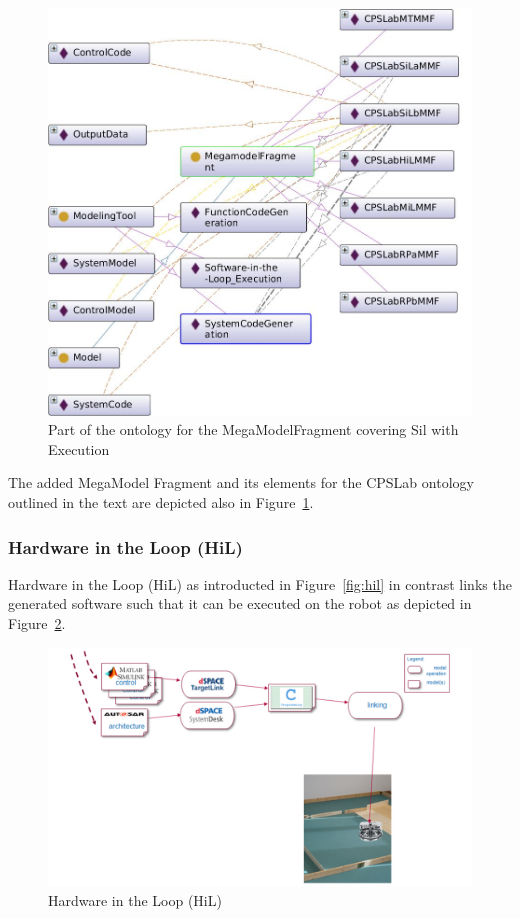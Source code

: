\begin{figure}[!htb]
\centering
\includegraphics[scale=0.333]{figures/CPSLabSiLbMMF.jpg}
\caption{Part of the ontology for the MegaModelFragment \CPSLabSiLbMMF covering Sil with Execution}
\label{fig:CPSLabSiLbMMF}
\end{figure}

The added MegaModel Fragment \CPSLabSiLbMMF and its elements for the CPSLab ontology outlined in the text are depicted also in Figure~\ref{fig:CPSLabSiLbMMF}.


\subsubsection{Hardware in the Loop (HiL)}
%
Hardware in the Loop (HiL) as introducted in Figure~\ref{fig:hil} in contrast links the generated software such that it can be executed on the robot as depicted in Figure~\ref{fig:MMFig9}.

\begin{figure}[!htb]
\centering
\includegraphics[scale=0.33]{figures/mm-hpi9.pdf}
\caption{Hardware in the Loop (HiL)}
\label{fig:MMFig9}
\end{figure}

